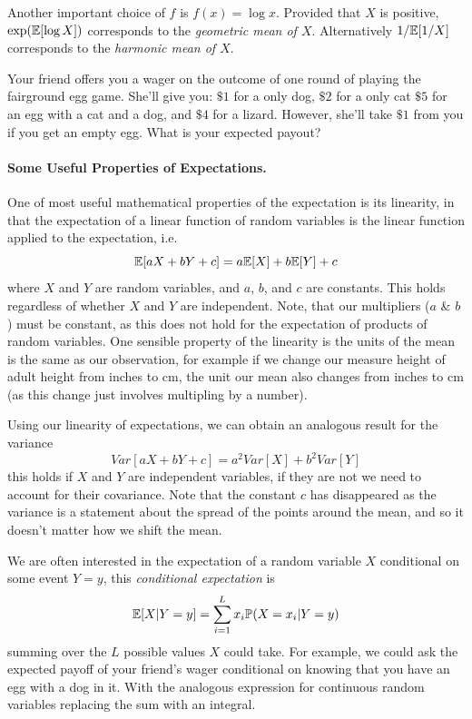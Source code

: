 Another important choice of $f$ is $f(x)=\log x$. Provided that $X$ is positive, $\exp(\mathbb{E}[\log X])$ corresponds to the  \emph{geometric mean of $X$}. Alternatively $1/\mathbb{E}[1/X]$ corresponds to the \emph{harmonic mean of $X$}. 


\begin{question}
Your friend offers you a wager on the outcome of one round of playing the
fairground egg game. She'll give you: $\$1$ for a only dog, $\$2$ for
a only cat
$\$5$ for an egg with a cat and a dog, and $\$4$ for a
lizard. However, she'll take $\$1$ from you if you get an empty
egg. What is your expected payout?
  \end{question}

\paragraph{Some Useful Properties of Expectations.}
One of most useful mathematical properties of the expectation is its
linearity, in that the expectation of a linear function of random
variables is the linear function applied to the expectation, i.e. 
\begin{equation}
\mathbb{E}[aX+bY+c]= a\mathbb{E}[X] + b \mathbb{E}[Y] +c \label{eqn:linearity_expectation}
\end{equation}
where $X$ and $Y$ are random variables, and $a$, $b$, and $c$ are
constants. This holds regardless of whether $X$ and $Y$ are
independent. Note, that our multipliers ($a$ \& $b$) must be constant, as
this does not hold for the expectation of products of random
variables. One sensible property of the linearity is the units of the
mean is the same as our observation, for example if we change our measure height
of adult height from inches to cm, the unit our mean also changes from
inches to cm (as this change just involves multipling by a number). 

Using our linearity of expectations, we can obtain an analogous result for the variance
\begin{equation}
Var[aX+bY+c]= a^2Var[X] + b^2 Var[Y] 
\end{equation}
this holds if $X$ and $Y$ are independent variables, if they are not
we need to account for their covariance. Note that the constant $c$
has disappeared as the variance is a statement about the spread of the
points around the mean, and so it doesn't matter how we shift the
mean. 

We are often interested in the expectation of a random variable $X$
conditional on some event $Y=y$, this \emph{conditional expectation} is
\begin{equation}
\mathbb{E}[X|Y=y] = \sum_{i=1}^L x_i \mathbb{P}(X=x_i|Y=y) 
 \end{equation}
summing over the $L $ possible values $X$ could take. For example, we could ask the expected payoff of your friend's wager
conditional on knowing that you have an egg with a dog in it. With the
analogous expression for continuous random variables replacing the sum
with an integral.

